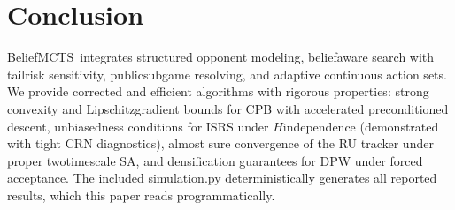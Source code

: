 \section{Conclusion}
Belief\textendash MCTS\textendash \sCRF\ integrates structured opponent modeling, belief\textendash aware search with tail\textendash risk sensitivity, public\textendash subgame re\textendash solving, and adaptive continuous action sets. We provide corrected and efficient algorithms with rigorous properties: strong convexity and Lipschitz\textendash gradient bounds for CPB with accelerated preconditioned descent, unbiasedness conditions for IS\textendash RS under $H$\textendash independence (demonstrated with tight CRN diagnostics), almost sure convergence of the RU tracker under proper two\textendash timescale SA, and densification guarantees for DPW under forced acceptance. The included simulation.py deterministically generates all reported results, which this paper reads programmatically.

